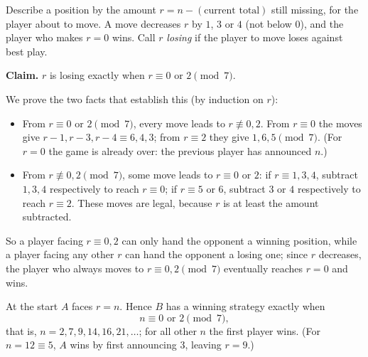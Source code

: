 Describe a position by the amount $r=n-(\text{current total})$ still missing, for the player about to move. A move decreases $r$ by $1$, $3$ or $4$ (not below $0$), and the player who makes $r=0$ wins. Call $r$ \emph{losing} if the player to move loses against best play.

\textbf{Claim.} $r$ is losing exactly when $r\equiv0$ or $2\pmod 7$.

We prove the two facts that establish this (by induction on $r$):
\begin{itemize}
\item From $r\equiv0$ or $2\pmod7$, every move leads to $r\not\equiv0,2$. From $r\equiv0$ the moves give $r-1,r-3,r-4\equiv6,4,3$; from $r\equiv2$ they give $1,6,5\pmod7$. (For $r=0$ the game is already over: the previous player has announced $n$.)
\item From $r\not\equiv0,2\pmod7$, some move leads to $r\equiv0$ or $2$: if $r\equiv1,3,4$, subtract $1,3,4$ respectively to reach $r\equiv0$; if $r\equiv5$ or $6$, subtract $3$ or $4$ respectively to reach $r\equiv2$. These moves are legal, because $r$ is at least the amount subtracted.
\end{itemize}
So a player facing $r\equiv0,2$ can only hand the opponent a winning position, while a player facing any other $r$ can hand the opponent a losing one; since $r$ decreases, the player who always moves to $r\equiv0,2\pmod7$ eventually reaches $r=0$ and wins.

At the start $A$ faces $r=n$. Hence $B$ has a winning strategy exactly when
\[\boxed{n\equiv0\text{ or }2\pmod 7},\]
that is, $n=2,7,9,14,16,21,\dots$; for all other $n$ the first player wins. (For $n=12\equiv5$, $A$ wins by first announcing $3$, leaving $r=9$.)
